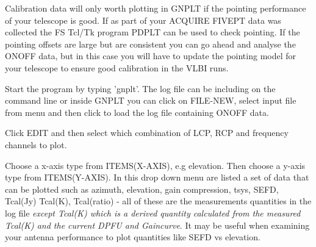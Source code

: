 
\vskip 1cm

\vskip 0.5cm

  Calibration data will only worth plotting in GNPLT if the pointing 
  performance of your telescope is good. If as part of your ACQUIRE  
  FIVEPT data was collected the FS Tcl/Tk program 
  PDPLT can be used to check pointing. If the pointing offsets
  are large but are consistent you can go ahead and analyse the ONOFF
  data, but in this case you will have to update the pointing model for
  your telescope to ensure good calibration in the VLBI runs.

\vfill
\eject

\vskip 0.5cm

   Start the program by typing 'gnplt'. The log file can be 
   including on the command line or inside GNPLT you can 
   click on FILE-NEW, select input file from menu and then click
   to load the log file containing ONOFF data.

\vskip 0.5cm


\vskip 0.5cm

   Click EDIT and then select which combination of LCP, RCP 
   and frequency channels to plot.
 
   Choose a x-axis type from ITEMS(X-AXIS), e.g elevation. 
   Then choose a y-axis type from ITEMS(Y-AXIS). 
   In this drop down menu are listed a set of 
   data that can be plotted such as  azimuth, elevation, gain 
   compression, tsys, SEFD, Tcal(Jy) Tcal(K), Tcal(ratio) - all of these 
   are the measurements quantities in the log file {\it except Tcal(K) 
   which is a derived quantity  calculated from the   measured Tcal(K) 
   and the current DPFU and Gaincurve}.  It may be useful when 
   examining your antenna performance  to plot quantities like SEFD vs 
   elevation. 


